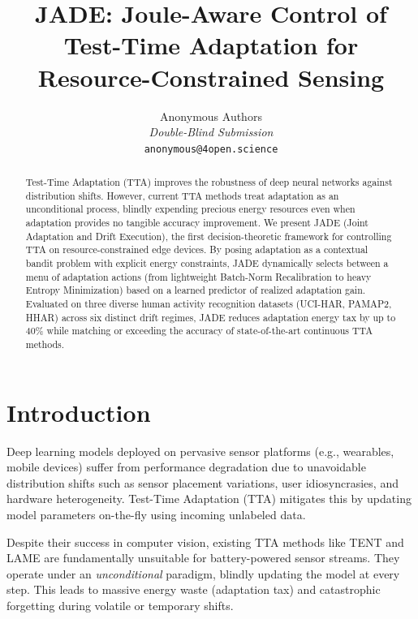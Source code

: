 \documentclass[10pt, conference, compsocconf]{IEEEtran}
\begin{document}
\title{JADE: Joule-Aware Control of Test-Time Adaptation for Resource-Constrained Sensing}

\author{Anonymous Authors\\ \textit{Double-Blind Submission}\\ \texttt{anonymous@4open.science}}

\maketitle

\begin{abstract}
Test-Time Adaptation (TTA) improves the robustness of deep neural networks against distribution shifts. However, current TTA methods treat adaptation as an unconditional process, blindly expending precious energy resources even when adaptation provides no tangible accuracy improvement. We present JADE (Joint Adaptation and Drift Execution), the first decision-theoretic framework for controlling TTA on resource-constrained edge devices. By posing adaptation as a contextual bandit problem with explicit energy constraints, JADE dynamically selects between a menu of adaptation actions (from lightweight Batch-Norm Recalibration to heavy Entropy Minimization) based on a learned predictor of realized adaptation gain. Evaluated on three diverse human activity recognition datasets (UCI-HAR, PAMAP2, HHAR) across six distinct drift regimes, JADE reduces adaptation energy tax by up to 40\% while matching or exceeding the accuracy of state-of-the-art continuous TTA methods.
\end{abstract}

\section{Introduction}

Deep learning models deployed on pervasive sensor platforms (e.g., wearables, mobile devices) suffer from performance degradation due to unavoidable distribution shifts such as sensor placement variations, user idiosyncrasies, and hardware heterogeneity. Test-Time Adaptation (TTA) mitigates this by updating model parameters on-the-fly using incoming unlabeled data. 

Despite their success in computer vision, existing TTA methods like TENT and LAME are fundamentally unsuitable for battery-powered sensor streams. They operate under an \textit{unconditional} paradigm, blindly updating the model at every step. This leads to massive energy waste (adaptation tax) and catastrophic forgetting during volatile or temporary shifts. 
\end{document}
